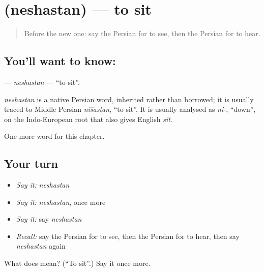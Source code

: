 \section[\texorpdfstring{\fa{نشستن} (neshastan)}{نشستن (neshastan)}]{ (neshastan) — to sit}

\label{lesson:FA-C35-neshastan}



\begin{quote}
Before the new one: say the Persian for to see, then the Persian for to hear.
\end{quote}

\subsection*{You'll want to know: }
\textbf{} — \emph{neshastan} — \textquotedblleft{}to sit\textquotedblright{}.

\begin{cousinweb}
\emph{neshastan} is a native Persian word, inherited rather than borrowed; it is usually traced to Middle Persian \emph{nišastan}, \textquotedblleft{}to sit\textquotedblright{}. It is usually analysed as \emph{ni-}, \textquotedblleft{}down\textquotedblright{}, on the Indo-European root that also gives English \emph{sit}.
\end{cousinweb}

\begin{grammarlens}[title={What you've built}]
One more word for this chapter.
\end{grammarlens}

\subsection*{Your turn}
\begin{itemize}
\raggedright
  \item \emph{Say it:} \emph{neshastan}
  \item \emph{Say it:} \emph{neshastan}, once more
  \item \emph{Say it:} say \emph{neshastan}
  \item \emph{Recall:} say the Persian for to see, then the Persian for to hear, then say \emph{neshastan} again
\end{itemize}

\begin{tcolorbox}[breakable,colback=teal!4,colframe=teal!35!black,title={Before you move on}]
What does  mean? (\textquotedblleft{}To sit\textquotedblright{}.) Say it once more.
\end{tcolorbox}
